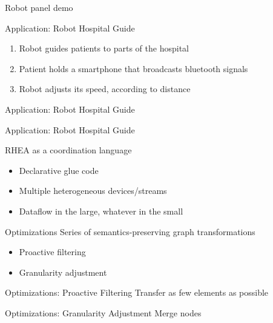 \documentclass{beamer}
\begin{document}
	\begin{frame}[standout]
	  Robot panel demo
	\end{frame}
	
	\begin{frame}{Application: Robot Hospital Guide}
	  \begin{enumerate}
	  \item Robot guides patients to parts of the hospital
	  \item Patient holds a smartphone that broadcasts bluetooth signals
	  \item Robot adjusts its speed, according to distance
	  \end{enumerate}
	\end{frame}
	\begin{frame}{Application: Robot Hospital Guide}
	\end{frame}
	\begin{frame}{Application: Robot Hospital Guide}
	\end{frame}
	
	\begin{frame}{RHEA as a coordination language}
	  \begin{itemize}
	  \item Declarative glue code
	  \item Multiple heterogeneous devices/streams
	  \item Dataflow in the large, whatever in the small
	  \end{itemize}
	\end{frame}
	
	\begin{frame}{Optimizations}
	  Series of semantics-preserving graph transformations
	  \begin{itemize}
	  \item Proactive filtering
	  \item Granularity adjustment
	  \end{itemize}
	\end{frame}
	
	\begin{frame}{Optimizations: Proactive Filtering}
		Transfer as few elements as possible
	\end{frame}
	
	\begin{frame}{Optimizations: Granularity Adjustment}
	  Merge nodes
	\end{frame}
	
\end{document}
